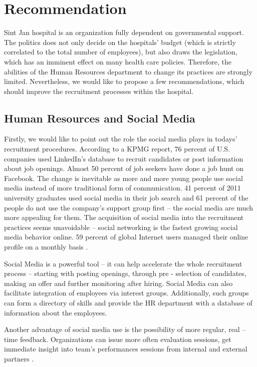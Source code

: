 \documentclass[a4paper,fleqn,11pt,dvips,titlepage]{article}
\numberwithin{figure}{section}
\numberwithin{equation}{section}
\begin{document}
\section{Recommendation}

Sint Jan hospital is an organization fully dependent on governmental support.
The politics does not only decide on the hospitals’ budget (which is strictly correlated to the total number of employees),
but also draws the legislation, which has an imminent effect on many health care policies.
Therefore, the abilities of the Human Resources department to change its practices are strongly limited.
Nevertheless, we would like to propose a few recommendations, which should improve the recruitment processes within the hospital. 

\subsection{Human Resources and Social Media}

Firstly, we would like to point out the role the social media plays in todays’ recruitment procedures.
According to a KPMG report, 76 percent of U.S. companies used LinkedIn’s database to recruit candidates or post information about job openings.
Almost 50 percent of job seekers have done a job hunt on Facebook.
The change is inevitable as more and more young people use social media instead of more traditional form of communication.
41 percent of 2011 university graduates used social media in their job search and 61 percent of the people do not use the company’s support group first –
the social media are much more appealing for them.
The acquisition of social media into the recruitment practices seems unavoidable –
social networking is the fastest growing social media behavior online.
59 percent of global Internet users managed their online profile on a monthly basis \cite{kpmg}. 

Social Media is a powerful tool – it can help accelerate the whole recruitment process – starting with posting openings,
through pre - selection of candidates, making an offer and further monitoring after hiring.
Social Media can also facilitate integration of employees via interest groups.
Additionally, such groups can form a directory of skills and provide the HR department with a database of information about the employees. 

Another advantage of social media use is the possibility of more regular, real – time feedback.
Organizations can issue more often evaluation sessions,
get immediate insight into team’s performances sessions from internal and external partners \cite{kpmg}. 
\end{document}
